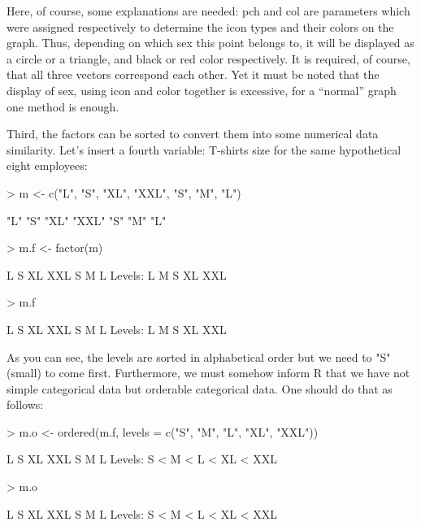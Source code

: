 \documentclass[a4paper,11pt]{scrartcl}
\begin{document}
Here, of course, some explanations are needed: pch and col are parameters which were assigned respectively to determine the icon types and their colors on the graph. Thus, depending on which sex this point belongs to, it will be displayed as a circle or a triangle, and black or red color respectively. It is required, of course, that all three vectors correspond each other. Yet it must be noted that the display of sex, using icon and color together is excessive, for a “normal” graph one method is enough.

Third, the factors can be sorted to convert them into some numerical data similarity. Let’s insert a fourth variable: T-shirts size for the same hypothetical eight employees:

\begin{Schunk}
\begin{Sinput}
> m <- c("L", "S", "XL", "XXL", "S", "M", "L")
\end{Sinput}
\begin{Soutput}
[1] "L"   "S"   "XL"  "XXL" "S"   "M"   "L"  
\end{Soutput}
\begin{Sinput}
> m.f <- factor(m)
\end{Sinput}
\begin{Soutput}
[1] L   S   XL  XXL S   M   L  
Levels: L M S XL XXL
\end{Soutput}
\begin{Sinput}
> m.f
\end{Sinput}
\begin{Soutput}
[1] L   S   XL  XXL S   M   L  
Levels: L M S XL XXL
\end{Soutput}
\end{Schunk}

As you can see, the levels are sorted in alphabetical order but we need to "S" (small) to come first. Furthermore, we must somehow inform R that we have not simple categorical data but orderable categorical data. One should do that as follows:
\begin{Schunk}
\begin{Sinput}
> m.o <- ordered(m.f, levels = c("S", "M", "L", "XL", "XXL"))
\end{Sinput}
\begin{Soutput}
[1] L   S   XL  XXL S   M   L  
Levels: S < M < L < XL < XXL
\end{Soutput}
\begin{Sinput}
> m.o
\end{Sinput}
\begin{Soutput}
[1] L   S   XL  XXL S   M   L  
Levels: S < M < L < XL < XXL
\end{Soutput}
\end{Schunk}
\end{document}
